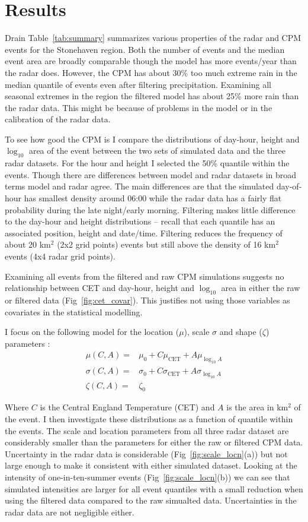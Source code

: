 \documentclass[11pt,a4paper]{article}
\begin{document}
\section{Results}
Drain
Table~\ref{tab:summary} summarizes various properties of the radar and CPM events for the Stonehaven region.  Both the number of events and the median event area are broadly comparable though the model has more events/year than the radar does.  However, the CPM has about 30\% too much extreme rain in the median quantile of events even after filtering precipitation. Examining  all seasonal extremes in the region the filtered model has about 25\% more rain than the radar data.  This might be because of problems in the model or in the calibration of the radar data. 

To see how good the CPM is I compare the distributions of  day-hour, height and  $\log_{10}$ area of the event between the two sets of simulated data and the three radar datasets. For the hour and height I selected the 50\% quantile within the events. Though there are differences between model and radar datasets in broad terms model and radar agree. The main differences are that the simulated day-of-hour has smallest density around 06:00 while the radar data has a fairly flat probability during the late night/early morning. Filtering makes little difference to the day-hour and height distributions -- recall that each quantile has an associated position, height and date/time. Filtering reduces the frequency of about 20 km$^2$ (2x2 grid points) events but still above the density of 16 km$^2$ events (4x4 radar grid points). 

Examining all events from the filtered and raw CPM simulations suggests no relationship between CET and day-hour, height and $\log_{10}$ area in either the raw or filtered data (Fig~\ref{fig:cet_covar}). This justifies not using those variables as covariates in the statistical modelling. 

I focus on the following  model for the location ($\mu$), scale $\sigma$ and shape ($\zeta$) parameters :
\begin{align}
	\mu(C,A) =& \mu_0 + C\mu_\text{CET}+A\mu_{\log_{10}A} \\
	 \sigma(C,A) =& \sigma_0 +C\sigma_\text{CET}+A\sigma_{\log_{10}A}\\
	 \zeta(C,A)=&\zeta_0
\end{align}

Where $C$ is the Central England Temperature (CET) and $A$ is the area in km$^2$ of the event.  I then investigate these distributions as a function of quantile within the events.  The scale and location parameters from all three radar dataset are considerably smaller than the parameters for either the raw or filtered CPM data. Uncertainty in the radar data is considerable (Fig~\ref{fig:scale_locn}(a)) but not large enough to make it consistent with either simulated dataset.  Looking at the intensity of one-in-ten-summer events (Fig~\ref{fig:scale_locn}(b)) we can see that simulated intensities are larger for all event quantiles with a small reduction when using the filtered data compared to the raw simualted data. Uncertainties in the radar data are not  negligible either. 
\end{document}
